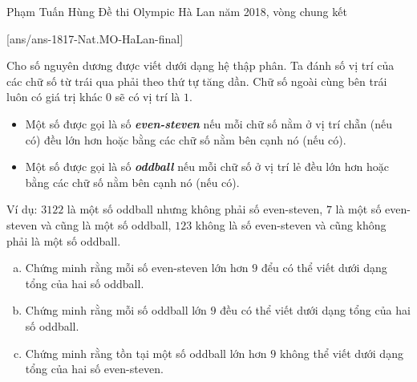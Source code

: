 
\begin{name}
{Phạm Tuấn Hùng}
{Đề thi Olympic Hà Lan năm 2018, vòng chung kết}%
\end{name}
\setcounter{ex}{0}
[ans/ans-1817-Nat.MO-HaLan-final]
\begin{ex}%
	Cho số nguyên dương được viết dưới dạng hệ thập phân. Ta đánh số vị trí của các chữ số từ trái qua phải theo thứ tự tăng dần. Chữ số ngoài cùng bên trái luôn có giá trị khác $0$ sẽ có vị trí là $1$.
	\begin{itemize}
		\item Một số được gọi là số \textbf{\textit{even-steven}} nếu mỗi chữ số nằm ở vị trí chẵn (nếu có) đều lớn hơn hoặc bằng các chữ số nằm bên cạnh nó (nếu có).
		\item Một số được gọi là số \textit{\textbf{oddball}} nếu mỗi chữ số ở vị trí lẻ đều lớn hơn hoặc bằng các chữ số nằm bên cạnh nó (nếu có).
	\end{itemize}
Ví dụ: $3122$ là một số oddball nhưng không phải số even-steven, $7$ là một số even-steven và cũng là một số oddball, $123$ không là số even-steven và cũng không phải là một số oddball.
\begin{enumerate}[a.]
	\item Chứng minh rằng mỗi số even-steven lớn hơn $9$ đểu có thể viết dưới dạng tổng của hai số oddball.
	\item Chứng minh rằng mỗi số oddball lớn $9$ đều có thể viết dưới dạng tổng của hai số oddball.
	\item Chứng minh rằng tồn tại một số oddball lớn hơn $9$ không thể viết dưới dạng tổng của hai số even-steven.
\end{enumerate}


\end{ex}
